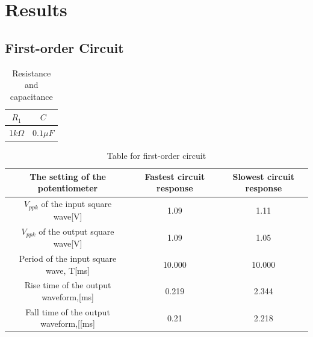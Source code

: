 \documentclass[12pt]{article}
\begin{document}
\section{Results}
\subsection{First-order Circuit}
\begin{table}[H]
\centering
\begin{tabular}{|c|c|}
\hline
$R_1$ & $C$ \\ \hline
1$k\Omega$ &$0.1\mu F$  \\ \hline
\end{tabular}
\caption{Resistance and capacitance}
\end{table}
\begin{table}[H]
\centering
\begin{tabular}{|c|c|c|}
\hline
The setting of the potentiometer & Fastest circuit response & Slowest circuit response  \\ \hline
$V_{ppk}$ of the input square wave[V]&1.09 & 1.11 \\ \hline
$V_{ppk}$ of the output square wave[V]&1.09& 1.05 \\ \hline
Period of the input square wave, T[ms]& 10.000 & 10.000 \\ \hline
Rise time of the output waveform,[ms]&0.219&2.344\\ \hline
Fall time of the output waveform,[[ms]&0.21&2.218  \\ \hline
\end{tabular}
\caption{Table for first-order circuit}
\end{table}
\end{document}
